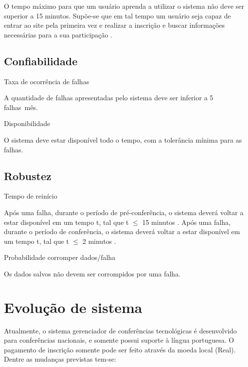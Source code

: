 \documentclass[letter]{article}
\begin{document}
O tempo máximo para que um usuário aprenda a utilizar o sistema não deve ser superior a 15 minutos.
Supõe-se que em tal tempo um usuário seja capaz de entrar ao site 
pela primeira vez e realizar a inscrição e buscar informações necessárias para a sua participação .


\subsection{Confiabilidade}
\textbullet\hspace{1mm} Taxa de ocorrência de falhas

A quantidade de falhas apresentadas pelo sistema deve ser inferior a 5 falhas\ mês.

\textbullet\hspace{1mm} Disponibilidade

O sistema deve estar disponível todo o tempo, com a tolerância mínima para as falhas.


\subsection{Robustez}
\textbullet\hspace{1mm} Tempo de reinício

Após uma falha, durante o período de pré-conferência, o sistema deverá voltar a estar disponível em um tempo t, tal que t $\leq$ 15 minutos .
Após uma falha, durante o período de conferência, o sistema deverá voltar a estar disponível em um tempo t, tal que t $\leq$ 2 minutos .

\textbullet\hspace{1mm} Probabilidade corromper dados/falha

Os dados salvos não devem ser corrompidos por uma falha.


\section{Evolução de sistema}
Atualmente, o sistema gerenciador de conferências tecnológicas é desenvolvido para conferências nacionais, e somente possui suporte à língua portuguesa. O pagamento de inscrição somente pode ser feito através da moeda local (Real).
Dentre as mudanças previstas tem-se:
\end{document}
